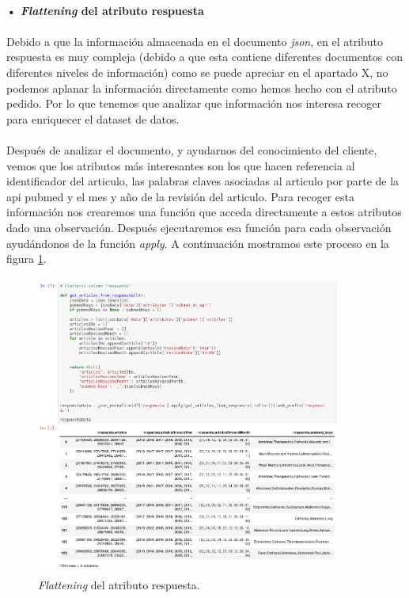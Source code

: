 \documentclass[10pt,a4paper,oneside]{book}
\begin{document}
\paragraph{• \textit{Flattening} del atributo respuesta}

\paragraph{}
Debido a que la información almacenada en el documento \textit{json}, en el atributo respuesta es muy compleja (debido a que esta contiene diferentes documentos con diferentes niveles de información) como se puede apreciar en el apartado X, no podemos aplanar la información directamente como hemos hecho con el atributo pedido. Por lo que tenemos que analizar que información nos interesa recoger para enriquecer el dataset de datos.

\paragraph{}
Después de analizar el documento, y ayudarnos del conocimiento del cliente, vemos que los atributos más interesantes son los que hacen referencia al identificador del articulo, las palabras claves asociadas al articulo por parte de la api pubmed y el mes y año de la revisión del articulo. Para recoger esta información nos crearemos una función que acceda directamente a estos atributos dado una observación. Después ejecutaremos esa función para cada observación ayudándonos de la función \textit{apply}. A continuación mostramos este proceso en la figura \ref{flatteningRespuesta}.

\paragraph{}
\begin{figure}[!htb]
  \centering
    \includegraphics[width=0.9\textwidth]{images/metodologia-aplanar-respuesta.png}
    \caption{\textit{Flattening} del atributo respuesta.}
  \label{flatteningRespuesta}
\end{figure}
\end{document}
